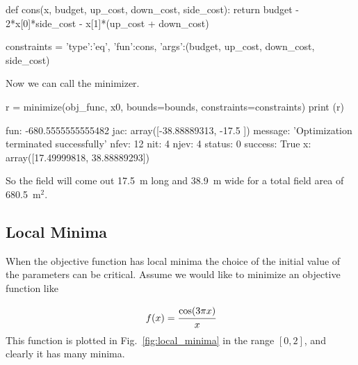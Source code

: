 \begin{ipython}
def cons(x, budget, up_cost, down_cost, side_cost):
    return budget - 2*x[0]*side_cost - x[1]*(up_cost + down_cost)

constraints = {'type':'eq', 'fun':cons,
               'args':(budget, up_cost, down_cost, side_cost)}
\end{ipython}

Now we can call the minimizer.

\begin{ipython}
r = minimize(obj_func, x0, bounds=bounds, constraints=constraints)
print (r)
\end{ipython}
\begin{ioutput}
    fun: -680.5555555555482
    jac: array([-38.88889313, -17.5       ])
message: 'Optimization terminated successfully'
   nfev: 12
    nit: 4  
   njev: 4
 status: 0
success: True
      x: array([17.49999818, 38.88889293])
\end{ioutput}

So the field will come out 17.5~m long and 38.9~m wide for a total field area of 680.5~$\textrm{m}^2$.

\subsection{Local Minima}
When the objective function has local minima the choice of the initial value of the parameters can be critical. 
Assume we would like to minimize an objective function like 

\[
f(x) = \cfrac{\mathrm{cos}(3\pi x)}{x}
\]
This function is plotted in Fig.~\ref{fig:local_minima} in the range $[0, 2]$, and clearly it has many minima. 


